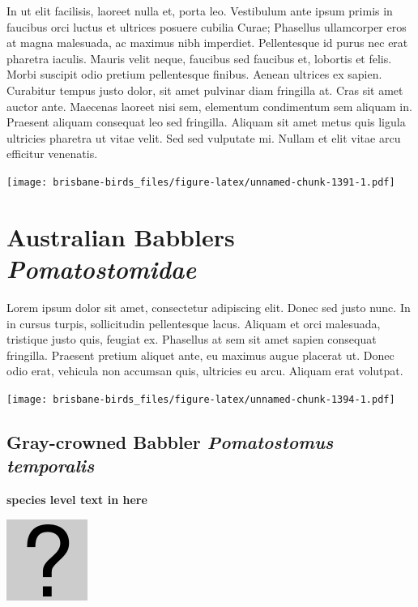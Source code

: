 \documentclass[]{book}
\let\origfigure\figure
\let\endorigfigure\endfigure
\renewenvironment{figure}[1][2] {
  \expandafter\origfigure\expandafter[H]
} {
  \endorigfigure
}
\begin{document}
In ut elit facilisis, laoreet nulla et, porta leo. Vestibulum ante ipsum
primis in faucibus orci luctus et ultrices posuere cubilia Curae;
Phasellus ullamcorper eros at magna malesuada, ac maximus nibh
imperdiet. Pellentesque id purus nec erat pharetra iaculis. Mauris velit
neque, faucibus sed faucibus et, lobortis et felis. Morbi suscipit odio
pretium pellentesque finibus. Aenean ultrices ex sapien. Curabitur
tempus justo dolor, sit amet pulvinar diam fringilla at. Cras sit amet
auctor ante. Maecenas laoreet nisi sem, elementum condimentum sem
aliquam in. Praesent aliquam consequat leo sed fringilla. Aliquam sit
amet metus quis ligula ultricies pharetra ut vitae velit. Sed sed
vulputate mi. Nullam et elit vitae arcu efficitur venenatis.

\begin{figure}
\centering
\texttt{[image: brisbane-birds\_files/figure-latex/unnamed-chunk-1391-1.pdf]}
\caption{\label{fig:unnamed-chunk-1391}insert figure caption}
\end{figure}

\chapter{\texorpdfstring{Australian Babblers
\emph{Pomatostomidae}}{Australian Babblers Pomatostomidae}}\label{australian-babblers-pomatostomidae}

Lorem ipsum dolor sit amet, consectetur adipiscing elit. Donec sed justo
nunc. In in cursus turpis, sollicitudin pellentesque lacus. Aliquam et
orci malesuada, tristique justo quis, feugiat ex. Phasellus at sem sit
amet sapien consequat fringilla. Praesent pretium aliquet ante, eu
maximus augue placerat ut. Donec odio erat, vehicula non accumsan quis,
ultricies eu arcu. Aliquam erat volutpat.

\texttt{[image: brisbane-birds\_files/figure-latex/unnamed-chunk-1394-1.pdf]}

\section{\texorpdfstring{Gray-crowned Babbler \emph{Pomatostomus
temporalis}}{Gray-crowned Babbler Pomatostomus temporalis}}\label{gray-crowned-babbler-pomatostomus-temporalis}

\textbf{species level text in here}

\begin{figure}
\centering
\includegraphics{assets/missing.png}
\caption{No image for species}
\end{figure}
\end{document}
